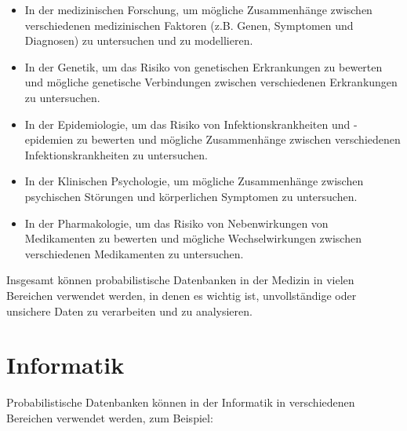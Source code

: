 \begin{itemize}
	\item In der medizinischen Forschung, um mögliche Zusammenhänge zwischen verschiedenen medizinischen Faktoren (z.B. Genen, Symptomen und Diagnosen) zu untersuchen und zu modellieren.
	
	\item In der Genetik, um das Risiko von genetischen Erkrankungen zu bewerten und mögliche genetische Verbindungen zwischen verschiedenen Erkrankungen zu untersuchen.
	
	\item In der Epidemiologie, um das Risiko von Infektionskrankheiten und -epidemien zu bewerten und mögliche Zusammenhänge zwischen verschiedenen Infektionskrankheiten zu untersuchen.
	
	\item In der Klinischen Psychologie, um mögliche Zusammenhänge zwischen psychischen Störungen und körperlichen Symptomen zu untersuchen.
	
	\item In der Pharmakologie, um das Risiko von Nebenwirkungen von Medikamenten zu bewerten und mögliche Wechselwirkungen zwischen verschiedenen Medikamenten zu untersuchen.
	
\end{itemize}
Insgesamt können probabilistische Datenbanken in der Medizin in vielen Bereichen verwendet werden, in denen es wichtig ist, unvollständige oder unsichere Daten zu verarbeiten und zu analysieren.

\clearpage

\section{Informatik}
Probabilistische Datenbanken können in der Informatik in verschiedenen Bereichen verwendet werden, zum Beispiel:


